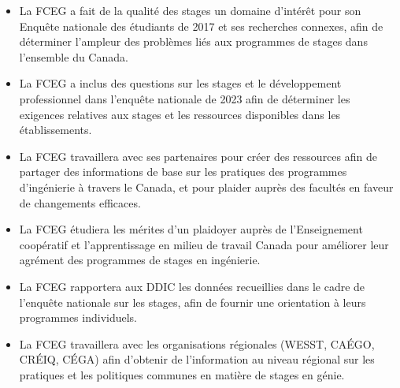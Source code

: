 \begin{itemize}
 \item La FCEG a fait de la qualité des stages un domaine d'intérêt pour son Enquête nationale des étudiants de 2017 et ses recherches connexes, afin de déterminer l'ampleur des problèmes liés aux programmes de stages dans l'ensemble du Canada.
 \item La FCEG a inclus des questions sur les stages et le développement professionnel dans l'enquête nationale de 2023 afin de déterminer les exigences relatives aux stages et les ressources disponibles dans les établissements.
\end{itemize}

\begin{itemize}
 \item La FCEG travaillera avec ses partenaires pour créer des ressources afin de partager des informations de base sur les pratiques des programmes d'ingénierie à travers le Canada, et pour plaider auprès des facultés en faveur de changements efficaces.
 \item La FCEG étudiera les mérites d'un plaidoyer auprès de l'Enseignement coopératif et l'apprentissage en milieu de travail Canada pour améliorer leur agrément des programmes de stages en ingénierie.
 \item La FCEG rapportera aux DDIC les données recueillies dans le cadre de l'enquête nationale sur les stages, afin de fournir une orientation à leurs programmes individuels.
 \item La FCEG travaillera avec les organisations régionales (WESST, CAÉGO, CRÉIQ, CÉGA) afin d'obtenir de l'information au niveau régional sur les pratiques et les politiques communes en matière de stages en génie.
\end{itemize}

\newpage
